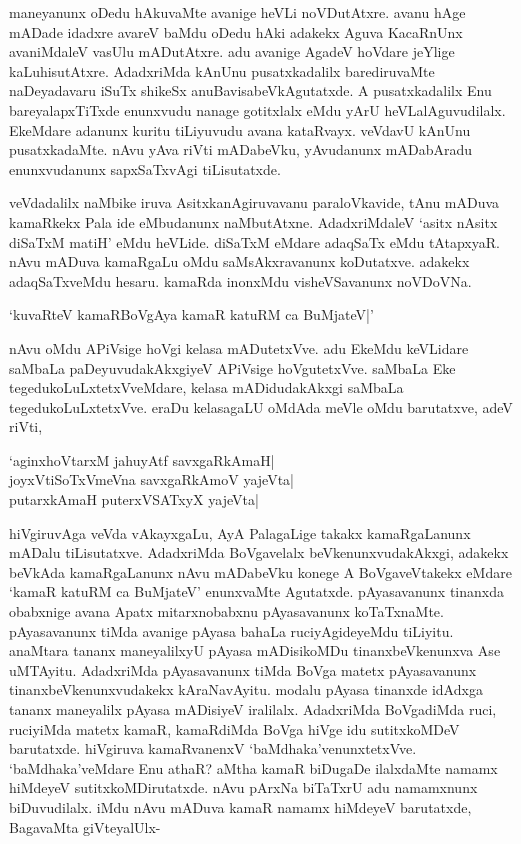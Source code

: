 maneyanunx oDedu hAkuvaMte avanige heVLi noVDutAtxre. avanu hAge mADade idadxre avareV baMdu oDedu hAki adakekx Aguva KacaRnUnx avaniMdaleV vasUlu mADutAtxre. adu avanige AgadeV hoVdare jeYlige kaLuhisutAtxre. AdadxriMda kAnUnu pusatxkadalilx barediruvaMte naDeyadavaru iSuTx shikeSx anuBavisabeVkAgutatxde. A pusatxkadalilx Enu bareyalapxTiTxde enunxvudu nanage gotitxlalx eMdu yArU heVLalAguvudilalx. EkeMdare adanunx kuritu tiLiyuvudu avana kataRvayx. veVdavU kAnUnu pusatxkadaMte. nAvu yAva riVti mADabeVku, yAvudanunx mADabAradu enunxvudanunx sapxSaTxvAgi tiLisutatxde.

veVdadalilx naMbike iruva AsitxkanAgiruvavanu paraloVkavide, tAnu mADuva kamaRkekx Pala ide eMbudanunx naMbutAtxne. AdadxriMdaleV `asitx nAsitx diSaTxM matiH' eMdu heVLide. diSaTxM eMdare adaqSaTx eMdu tAtapxyaR. nAvu mADuva kamaRgaLu oMdu saMsAkxravanunx koDutatxve. adakekx adaqSaTxveMdu hesaru. kamaRda inonxMdu visheVSavanunx noVDoVNa.

\begin{shloka}
`kuvaRteV kamaRBoVgAya kamaR katuRM ca BuMjateV|'
\end{shloka}

nAvu oMdu APiVsige hoVgi kelasa mADutetxVve. adu EkeMdu keVLidare saMbaLa paDeyuvudakAkxgiyeV APiVsige hoVgutetxVve. saMbaLa Eke tegedukoLuLxtetxVveMdare, kelasa mADidudakAkxgi saMbaLa tegedukoLuLxtetxVve. eraDu kelasagaLU oMdAda meVle oMdu barutatxve, adeV riVti,

\begin{shloka}
`aginxhoVtarxM jahuyAtf savxgaRkAmaH|\\
joyxVtiSoTxVmeVna savxgaRkAmoV yajeVta|\\
putarxkAmaH puterxVSATxyX yajeVta|
\end{shloka}

hiVgiruvAga veVda vAkayxgaLu, AyA PalagaLige takakx kamaRgaLanunx mADalu tiLisutatxve. AdadxriMda BoVgavelalx beVkenunxvudakAkxgi, adakekx beVkAda kamaRgaLanunx nAvu mADabeVku konege A BoVgaveVtakekx eMdare `kamaR katuRM ca BuMjateV' enunxvaMte Agutatxde. pAyasavanunx tinanxda obabxnige avana Apatx mitarxnobabxnu pAyasavanunx koTaTxnaMte. pAyasavanunx tiMda avanige pAyasa bahaLa ruciyAgideyeMdu tiLiyitu. anaMtara tananx maneyalilxyU pAyasa mADisikoMDu tinanxbeVkenunxva Ase uMTAyitu. AdadxriMda pAyasavanunx tiMda BoVga matetx pAyasavanunx tinanxbeVkenunxvudakekx kAraNavAyitu. modalu pAyasa tinanxde idAdxga tananx maneyalilx pAyasa mADisiyeV iralilalx. AdadxriMda BoVgadiMda ruci, ruciyiMda matetx kamaR, kamaRdiMda BoVga hiVge idu sutitxkoMDeV barutatxde. hiVgiruva kamaRvanenxV `baMdhaka'venunxtetxVve. `baMdhaka'veMdare Enu athaR? aMtha kamaR biDugaDe ilalxdaMte namamx hiMdeyeV sutitxkoMDirutatxde. nAvu pArxNa biTaTxrU adu namamxnunx biDuvudilalx. iMdu nAvu mADuva kamaR namamx hiMdeyeV barutatxde, BagavaMta giVteyalUlx-

